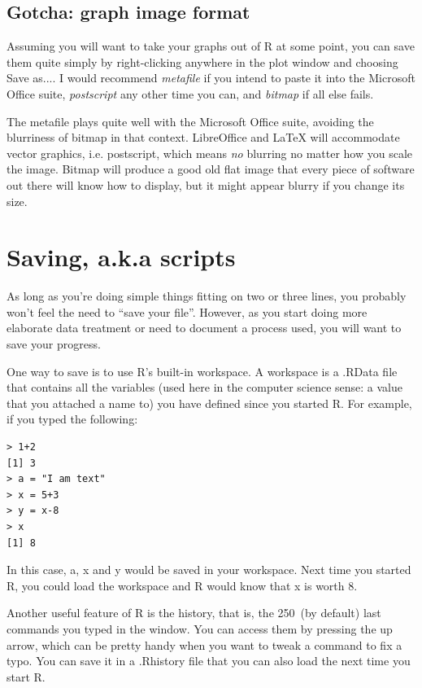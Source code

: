 \documentclass{report}
\newcommand{\code}[1]{\textsf{\ttfamily #1}}
\begin{document}
			\subsection{Gotcha: graph image format}
			Assuming you will want to take your graphs out of R at some point, you can save them quite simply by right-clicking anywhere in the plot window and choosing \code{Save as...}. I would recommend \emph{metafile} if you intend to paste it into the Microsoft Office suite, \emph{postscript} any other time you can, and \emph{bitmap} if all else fails.
			
			The metafile plays quite well with the Microsoft Office suite, avoiding the blurriness of bitmap in that context. LibreOffice and LaTeX will accommodate vector graphics, i.e. postscript, which means \emph{no} blurring no matter how you scale the image. Bitmap will produce a good old flat image that every piece of software out there will know how to display, but it might appear blurry if you change its size.
	
	\section{Saving, a.k.a scripts}
	As long as you're doing simple things fitting on two or three lines, you probably won't feel the need to ``save your file''. However, as you start doing more elaborate data treatment or need to document a process used, you will want to save your progress.
	
	One way to save is to use R's built-in \code{workspace}. A \code{workspace} is a \code{.RData} file that contains all the variables (used here in the computer science sense: a value that you attached a name to) you have defined since you started R. For example, if you typed the following:
	\begin{verbatim}
> 1+2
[1] 3
> a = "I am text"
> x = 5+3
> y = x-8
> x
[1] 8
	\end{verbatim}
	In this case, \code{a}, \code{x} and \code{y} would be saved in your workspace. Next time you started R, you could load the \code{workspace} and R would know that x is worth 8.
	
	Another useful feature of R is the history, that is, the 250~(by default) last commands you typed in the window. You can access them by pressing the up arrow, which can be pretty handy when you want to tweak a command to fix a typo. You can save it in a \code{.Rhistory} file that you can also load the next time you start R.
	
\end{document}
